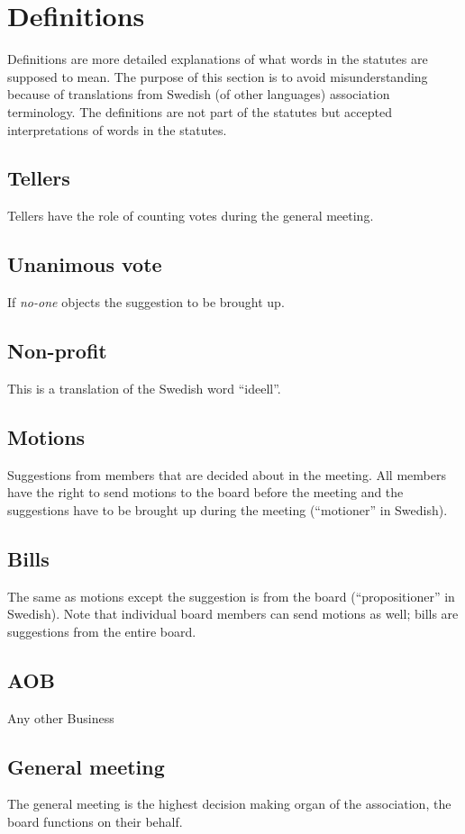 \section*{Definitions}

Definitions are more detailed explanations of what words in the statutes are supposed to mean. The purpose of this section is to avoid misunderstanding because of translations from Swedish (of other languages) association terminology. The definitions are not part of the statutes but accepted interpretations of words in the statutes. 

\subsection*{Tellers}
Tellers have the role of counting votes during the general meeting.

\subsection*{Unanimous vote}
If \emph{no-one} objects the suggestion to be brought up.

\subsection*{Non-profit}
This is a translation of the Swedish word “ideell”.

\subsection*{Motions}
Suggestions from members that are decided about in the meeting. All members have the right to send motions to the board before the meeting and the suggestions have to be brought up during the meeting (“motioner” in Swedish). 

\subsection*{Bills}
The same as motions except the suggestion is from the board (“propositioner” in Swedish). Note that individual board members can send motions as well; bills are suggestions from the entire board.

\subsection*{AOB}
Any other Business 

\subsection*{General meeting}
The general meeting is the highest decision making organ of the association, the board functions on their behalf. 

